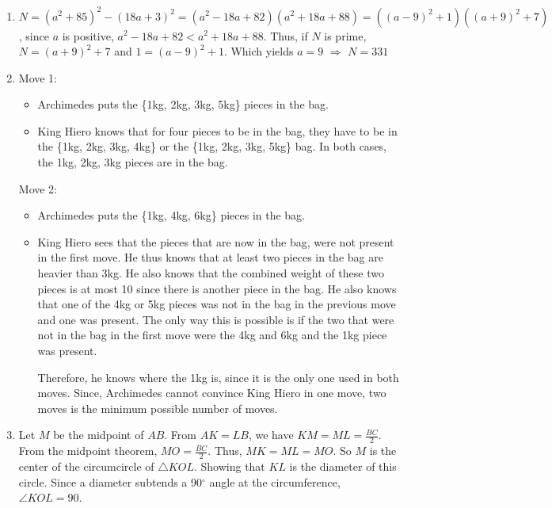 \documentclass{article}
\begin{document}
\begin{enumerate}
\item $N =(a^{2} + 85)^{2} - (18a+3)^{2} = (a^{2} -18a + 82)(a^{2} + 18a + 88) = ((a-9)^{2} + 1)((a+9)^{2} + 7)$, since $a$ is positive, $a^{2} -18a + 82 < a^{2} + 18a + 88$. Thus, if $N$ is prime, $N = (a+9)^{2} + 7$ and $1 = (a-9)^{2} + 1$. Which yields $a = 9$ $\Rightarrow$ $N = 331$

\item Move 1:
\begin{itemize}
    \item Archimedes puts the \{1kg, 2kg, 3kg, 5kg\} pieces in the bag.
    \item King Hiero knows that for four pieces to be in the bag, they have to be in the \{1kg, 2kg, 3kg, 4kg\} or the \{1kg, 2kg, 3kg, 5kg\} bag. In both cases, the 1kg, 2kg, 3kg pieces are in the bag.
\end{itemize}
\newline
Move 2:
\begin{itemize}
    \item Archimedes puts the \{1kg, 4kg, 6kg\} pieces in the bag.
    \item King Hiero sees that the pieces that are now in the bag, were not present in the first move. He thus knows that at least two pieces in the bag are heavier than 3kg. He also knows that the combined weight of these two pieces is at most 10 since there is another piece in the bag. He also knows that one of the 4kg or 5kg pieces was not in the bag in the previous move and one was present. The only way this is possible is if the two that were not in the bag in the first move were the 4kg and 6kg and the 1kg piece was present. 

    Therefore, he knows where the 1kg is, since it is the only one used in both moves. Since, Archimedes cannot convince King Hiero in one move, two moves is the minimum possible number of moves.
\end{itemize}

\item Let $M$ be the midpoint of $AB$. From $AK = LB$, we have $KM = ML = \frac{BC}{2}$. From the midpoint theorem, $MO = \frac{BC}{2}$. Thus, $MK = ML = MO$. So $M$ is the center of the circumcircle of $\triangle{KOL}$. Showing that $KL$ is the diameter of this circle. Since a diameter subtends a 90$^{\circ}$ angle at the circumference, $\angle{KOL} = 90$. 


\end{enumerate}
\end{document}
